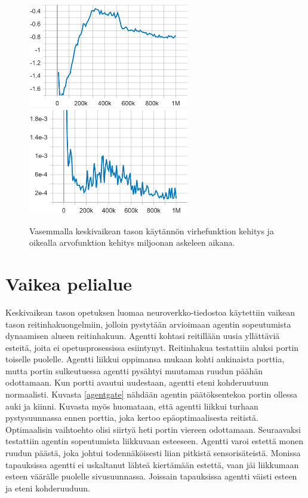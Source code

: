 \documentclass[utf8]{gradu3}
\begin{document}
\begin{figure}[h]
\includegraphics[width=7cm]{I_Policy_Loss.png}
\includegraphics[width=7cm]{I_Value_Loss.png}
\caption{Vasemmalla keskivaikean tason käytännön virhefunktion kehitys ja oikealla arvofunktion kehitys miljoonan askeleen aikana.}
\label{intermediateloss}
\end{figure}

\section{Vaikea pelialue}
\label{vaikea}

Keskivaikean tason opetuksen luomaa neuroverkko-tiedostoa käytettiin vaikean tason reitinhakuongelmiin, jolloin pystytään arvioimaan agentin sopeutumista dynaamisen alueen reitinhakuun. Agentti kohtasi reitillään uusia yllättäviä esteitä, joita ei opetusprosessissa esiintynyt. Reitinhakua testattiin aluksi portin toiselle puolelle. Agentti liikkui oppimansa mukaan kohti aukinaista porttia, mutta portin sulkeutuessa agentti pysähtyi muutaman ruudun päähän odottamaan. Kun portti avautui uudestaan, agentti eteni kohderuutuun normaalisti. Kuvasta \ref{agentgate} nähdään agentin päätöksentekoa portin ollessa auki ja kiinni. Kuvasta myös huomataan, että agentti liikkui turhaan pystysuunnassa ennen porttia, joka kertoo epäoptimaalisesta reitistä. Optimaalisin vaihtoehto olisi siirtyä heti portin viereen odottamaan. Seuraavaksi testattiin agentin sopeutumista liikkuvaan esteeseen. Agentti varoi estettä monen ruudun päästä, joka johtui todennäköisesti liian pitkistä sensorisäteistä. Monissa tapauksissa agentti ei uskaltanut lähteä kiertämään estettä, vaan jäi liikkumaan esteen väärälle puolelle sivusuunnassa. Joissain tapauksissa agentti väisti esteen ja eteni kohderuuduun.
\end{document}

